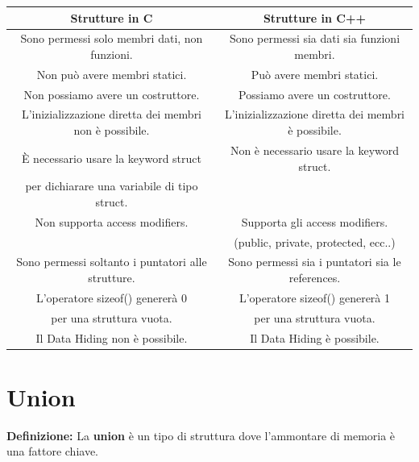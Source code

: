 \begin{tabular}{|c|c|}
	\hline
	\textbf{Strutture in C} & \textbf{Strutture in C++} \\
	\hline
	\textsf{\small Sono permessi solo membri dati, non funzioni.} & \textsf{\small Sono permessi sia dati sia funzioni membri.} \\
	\hline
	\textsf{\small Non può avere membri statici.} & \textsf{\small Può avere membri statici.} \\
	\hline
	\textsf{\small Non possiamo avere un costruttore.} & \textsf{\small Possiamo avere un costruttore.} \\
	\hline
	\textsf{\small L'inizializzazione diretta dei membri non è possibile.} & \textsf{\small L'inizializzazione diretta dei membri è possibile.} \\
	\hline
	\textsf{\small È necessario usare la keyword struct } & \textsf{\small Non è necessario usare la keyword struct.} \\
	\textsf{\small per dichiarare una variabile di tipo struct.} & \textsf{\small } \\
	\hline
	\textsf{\small Non supporta access modifiers.} & \textsf{\small Supporta gli access modifiers. } \\
	\textsf{\small } & \textsf{\small (public, private, protected, ecc..)} \\
	\hline
	\textsf{\small Sono permessi soltanto i puntatori alle strutture.} & \textsf{\small Sono permessi sia i puntatori sia le references.} \\
	\hline
	\textsf{\small L'operatore sizeof() genererà 0 } & \textsf{\small L'operatore sizeof() genererà 1 } \\
	\textsf{\small per una struttura vuota.} & \textsf{\small per una struttura vuota.} \\
	\hline
	\textsf{\small Il Data Hiding non è possibile.} & \textsf{\small Il Data Hiding è possibile.} \\
	\hline
\end{tabular}


\section{Union}

\textsf{\small \textbf{Definizione: } La \textbf{union} è un tipo di struttura dove l'ammontare di memoria è una fattore chiave.} \\

